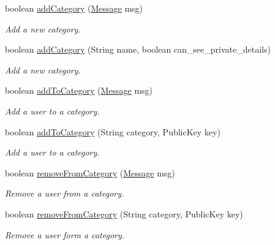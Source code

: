 \begin{DoxyCompactItemize}
boolean \hyperlink{classballmerpeak_1_1turtlenet_1_1server_1_1Database_a60f429af2120947b9a6cc06617bb1bea}{add\-Category} (\hyperlink{classballmerpeak_1_1turtlenet_1_1shared_1_1Message}{Message} msg)
\begin{DoxyCompactList}\small\item\em Add a new category. \end{DoxyCompactList}\item 
boolean \hyperlink{classballmerpeak_1_1turtlenet_1_1server_1_1Database_a543175382e7c3baf70b684a79c5046d8}{add\-Category} (String name, boolean can\-\_\-see\-\_\-private\-\_\-details)
\begin{DoxyCompactList}\small\item\em Add a new category. \end{DoxyCompactList}\item 
boolean \hyperlink{classballmerpeak_1_1turtlenet_1_1server_1_1Database_aca5e259e29216730354cf97b87f1a070}{add\-To\-Category} (\hyperlink{classballmerpeak_1_1turtlenet_1_1shared_1_1Message}{Message} msg)
\begin{DoxyCompactList}\small\item\em Add a user to a category. \end{DoxyCompactList}\item 
boolean \hyperlink{classballmerpeak_1_1turtlenet_1_1server_1_1Database_a92b3b3bea181888c22086688816738aa}{add\-To\-Category} (String category, Public\-Key key)
\begin{DoxyCompactList}\small\item\em Add a user to a category. \end{DoxyCompactList}\item 
boolean \hyperlink{classballmerpeak_1_1turtlenet_1_1server_1_1Database_a2718a68613d43dabf2c62bebc9f41e05}{remove\-From\-Category} (\hyperlink{classballmerpeak_1_1turtlenet_1_1shared_1_1Message}{Message} msg)
\begin{DoxyCompactList}\small\item\em Remove a user from a category. \end{DoxyCompactList}\item 
boolean \hyperlink{classballmerpeak_1_1turtlenet_1_1server_1_1Database_a25313e4d456741744541e8b42d7bef9b}{remove\-From\-Category} (String category, Public\-Key key)
\begin{DoxyCompactList}\small\item\em Remove a user form a category. \end{DoxyCompactList}\item 

\end{DoxyCompactItemize}
